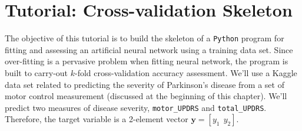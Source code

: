 \documentclass[graybox,envcountchap]{svmono}
\newcommand{\yf}{\mathbf{y}}
\newcommand{\nn}{neural network}
\newcommand{\tx}{\texttt}
\begin{document}
\section{Tutorial: Cross-validation Skeleton}

The objective of this tutorial is to build the skeleton of a \tx{Python} program for fitting and assessing an artificial {\nn } using a training data set.  Since over-fitting is a pervasive problem when fitting {\nn }, the program is built to carry-out $k$-fold cross-validation accuracy assessment. We'll use a Kaggle data set related to predicting the severity of Parkinson's disease from a set of motor control measurement (discussed at the beginning of this chapter). We'll predict two measures of disease severity, \verb+motor_UPDRS+ and \verb+total_UPDRS+. Therefore, the target variable is a 2-element vector $\yf = [y_1 \ \ y_2]$.
\end{document}
